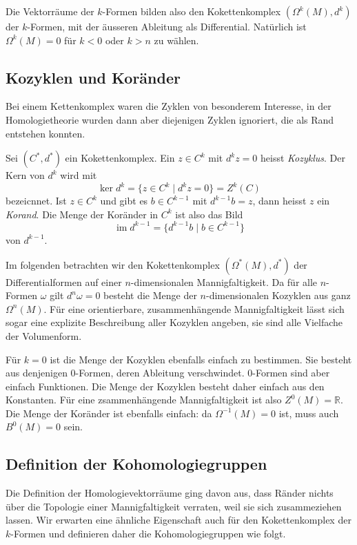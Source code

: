 Die Vektorräume der $k$-Formen bilden also den Kokettenkomplex
$(\Omega^k(M),d^k)$ der $k$-Formen,
mit der äusseren Ableitung als Differential.
Natürlich ist $\Omega^k(M)=0$ für $k<0$ oder $k>n$ zu wählen.

%
%
\subsection{Kozyklen und Koränder}
Bei einem Kettenkomplex waren die Zyklen von besonderem Interesse,
in der Homologietheorie wurden dann aber diejenigen Zyklen ignoriert,
die als Rand entstehen konnten.

\begin{definition}
Sei $(C^*,d^*)$ ein Kokettenkomplex.
Ein $z\in C^k$ mit $d^kz=0$ heisst \emph{Kozyklus}.
%
Der Kern von $d^k$ wird mit
\[
\ker d^k = \{ z\in C^k\mid d^kz=0\}
=
Z^k(C)
\]
bezeicnnet.
Ist $z\in C^k$ und gibt es $b\in C^{k-1}$ mit $d^{k-1}b=z$, dann 
heisst $z$ ein \emph{Korand}.
%
Die Menge der Koränder in $C^k$ ist also das Bild
\[
\operatorname{im}d^{k-1}
=
\{
d^{k-1}b\mid b\in C^{k-1}
\}
\]
von $d^{k-1}$.
\end{definition}

Im folgenden betrachten wir den Kokettenkomplex $(\Omega^*(M),d^*)$ 
der Differentialformen auf einer $n$-dimensionalen Mannigfaltigkeit.
Da für alle $n$-Formen $\omega$ gilt $d^n\omega=0$ besteht die Menge
der $n$-dimensionalen Kozyklen aus ganz $\Omega^n(M)$.
Für eine orientierbare, zusammenhängende Mannigfaltigkeit lässt sich
sogar eine explizite Beschreibung aller Kozyklen angeben, sie sind
alle Vielfache der Volumenform.

Für $k=0$ ist die Menge der Kozyklen ebenfalls einfach zu bestimmen.
Sie besteht aus denjenigen $0$-Formen, deren Ableitung verschwindet.
0-Formen sind aber einfach Funktionen.
Die Menge der Kozyklen besteht daher einfach aus den Konstanten.
Für eine zsammenhängende Mannigfaltigkeit ist also
$Z^0(M)=\mathbb{R}$.
Die Menge der Koränder ist ebenfalls einfach: da $\Omega^{-1}(M)=0$ ist,
muss auch $B^0(M)=0$ sein.

%
%
\subsection{Definition der Kohomologiegruppen}
Die Definition der Homologievektorräume ging davon aus, dass Ränder
nichts über die Topologie einer Mannigfaltigkeit verraten, weil sie
sich zusammeziehen lassen.
Wir erwarten eine ähnliche Eigenschaft auch für den Kokettenkomplex
der $k$-Formen und definieren daher die Kohomologiegruppen wie 
folgt.

